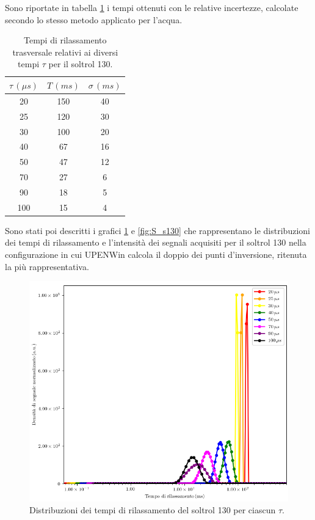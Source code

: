 Sono riportate in tabella \ref{tab:T_s130} i tempi ottenuti con le relative incertezze, calcolate secondo lo stesso metodo applicato per l'acqua.

\begin{table}[ht]
    \begin{center}
    \begin{tabular}{c c c}
    \toprule
    	${\tau}\,({\mu}s)$ & $T\,(ms)$ & ${\sigma}\,(ms)$ \\
    \midrule
	 20 & 150 & 40 \\
	 25 & 120 & 30 \\
	 30 & 100 & 20 \\
	 40 & 67 & 16 \\
	 50 & 47 & 12 \\
	 70 & 27 & 6 \\
	 90 & 18 & 5 \\
	 100 & 15 & 4 \\
    \bottomrule
    \end{tabular}
    \caption{Tempi di rilassamento trasversale relativi ai diversi tempi $\tau$ per il soltrol 130.}
    \label{tab:T_s130}
    \end{center}
\end{table}

Sono stati poi descritti i grafici \ref{fig:D_s130} e \ref{fig:S_s130} che rappresentano le distribuzioni dei tempi di rilassamento e l'intensità dei segnali acquisiti per il soltrol 130 nella configurazione in cui UPENWin calcola il doppio dei punti d'inversione, ritenuta la più rappresentativa.

\begin{figure}[ht]
\centering
\includegraphics[width=\columnwidth]{Figure/SOLTROL130.png}
\caption{Distribuzioni dei tempi di rilassamento del soltrol 130 per ciascun $\tau$.}
\label{fig:D_s130}
\end{figure}


